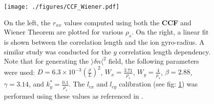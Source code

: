\documentclass[11pt,openany]{report}
\begin{document}
\begin{figure}[H]
    \centering
    \hspace*{-0cm}\texttt{[image: ./figures/CCF\_Wiener.pdf]}
    \caption{On the left, the $r_{xx}$ values computed using both the \textbf{CCF} and Wiener Theorem are plotted for various $\rho_s$. On the right, a linear fit is shown between the correlation length and the ion gyro-radius. A similar study was conducted for the $y$ correlation length dependency. Note that for generating the $\rangle \delta n \langle^2$ field, the following parameters were used: $D = 6.3 \times 10^{-3} (\frac{\rho}{L})^2$, $W_x = \frac{3.71}{\rho_s}$, $W_y = \frac{4}{\rho_s}$, $\beta = 2.88$, $\gamma = 3.14$, and $k_y^* = \frac{0.1}{\rho_s}$. The $l_{cx}$ and $l_{cy}$ calibration (see fig: \ref{Wiener}) was performed using these values as referenced in \cite{Unseparable_Turbulence_Spectra}.}
    \label{Wiener}
\end{figure}
\end{document}
